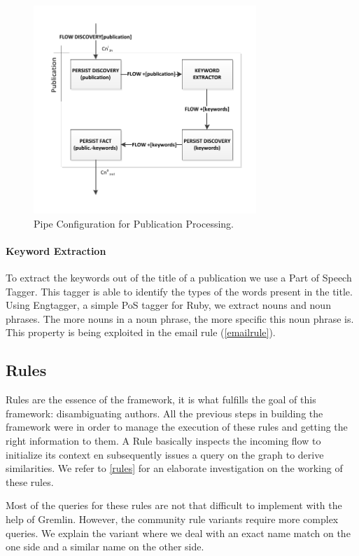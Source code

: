 \begin{figure}[htb]
	\centering
		\includegraphics[width=0.75\textwidth]{fig/publicationpipe}
	\caption{Pipe Configuration for Publication Processing.}
	\label{fig:publicationpipe}
\end{figure}

\paragraph{Keyword Extraction} To extract the keywords out of the title of a publication we use a Part of Speech Tagger. This tagger is able to identify the types of the words present in the title. Using Engtagger, a simple PoS tagger for Ruby, we extract nouns and noun phrases. The more nouns in a noun phrase, the more specific this noun phrase is. This property is being exploited in the email rule (\autoref{emailrule}).

\subsection{Rules}

Rules are the essence of the framework, it is what fulfills the goal of this framework: disambiguating authors. All the previous steps in building the framework were in order to manage the execution of these rules and getting the right information to them. A Rule basically inspects the incoming flow to initialize its context en subsequently issues a query on the graph to derive similarities. We refer to \autoref{rules} for an elaborate investigation on the working of these rules.

Most of the queries for these rules are not that difficult to implement with the help of Gremlin. However, the community rule variants require more complex queries. We explain the variant where we deal with an exact name match on the one side and a similar name on the other side. 

